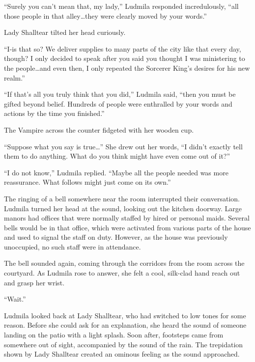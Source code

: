  

“Surely you can’t mean that, my lady,” Ludmila responded incredulously, “all those people in that alley…they were clearly moved by your words.”

 

Lady Shalltear tilted her head curiously.

 

“I-is that so? We deliver supplies to many parts of the city like that every day, though? I only decided to speak after you said you thought I was ministering to the people…and even then, I only repeated the Sorcerer King’s desires for his new realm.”

 

“If that’s all you truly think that you did,” Ludmila said, “then you must be gifted beyond belief. Hundreds of people were enthralled by your words and actions by the time you finished.”

 

The Vampire across the counter fidgeted with her wooden cup.

 

“Suppose what you say is true…” She drew out her words, “I didn’t exactly tell them to do anything. What do you think might have even come out of it?”

 

“I do not know,” Ludmila replied. “Maybe all the people needed was more reassurance. What follows might just come on its own.”

 

The ringing of a bell somewhere near the room interrupted their conversation. Ludmila turned her head at the sound, looking out the kitchen doorway. Large manors had offices that were normally staffed by hired or personal maids. Several bells would be in that office, which were activated from various parts of the house and used to signal the staff on duty. However, as the house was previously unoccupied, no such staff were in attendance.

 

The bell sounded again, coming through the corridors from the room across the courtyard. As Ludmila rose to answer, she felt a cool, silk-clad hand reach out and grasp her wrist.

 

“Wait.”

 

Ludmila looked back at Lady Shalltear, who had switched to low tones for some reason. Before she could ask for an explanation, she heard the sound of someone landing on the patio with a light splash. Soon after, footsteps came from somewhere out of sight, accompanied by the sound of the rain. The trepidation shown by Lady Shalltear created an ominous feeling as the sound approached.

